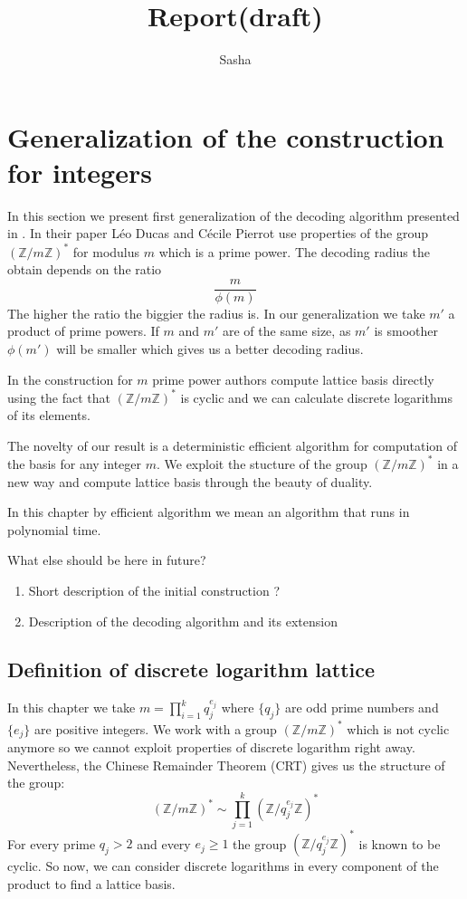 \documentclass[12pt]{article}
\title{Report(draft)}
\author{ Sasha }
\newcommand{\ZZ}{\mathbb{Z}}
\begin{document}
\maketitle

\section{Generalization of the construction for integers}
In this section we present first generalization of the decoding algorithm presented in \cite{[DP19]}. In their paper Léo Ducas and Cécile Pierrot use properties of the group $(\ZZ/m\ZZ)^*$ for modulus $m$ which is a prime power. The decoding radius the obtain  depends on the ratio
\[
\frac{m}{\phi(m)}
\]
The higher the ratio the biggier the radius is. In our generalization we take $m'$ a product of prime powers. If $m$ and $m'$ are of the same size, as $m'$ is smoother $\phi(m')$ will be smaller which gives us a better decoding radius.

In the construction for $m$ prime power authors compute lattice basis directly using the fact that $(\ZZ/m\ZZ)^*$ is cyclic and we can calculate discrete logarithms of its elements.

The novelty of our result is a deterministic efficient algorithm for computation of the basis for any integer $m$. We exploit the stucture of the group $(\ZZ/m\ZZ)^*$ in a new way and compute lattice basis through the beauty of duality.

In this chapter by efficient algorithm we mean an algorithm that runs in polynomial time.

What else should be here in future?
\begin{enumerate}
    \item Short description of the initial construction ?
    \item Description of the decoding algorithm and its extension
\end{enumerate}


\subsection{Definition of discrete logarithm lattice }
\label{definition section}
In this chapter we take $m = \prod_{i=1}^{k} q_{j}^{e_{j}}$ where $\{q_{j}\}$ are odd prime numbers and $\{e_{j}\}$ are positive integers. We work with a group $(\ZZ/m\ZZ)^*$ which is not cyclic anymore so we cannot exploit properties of discrete logarithm right away. Nevertheless, the Chinese Remainder Theorem (CRT) gives us the structure of the group:
\[
    (\ZZ/m\ZZ)^* \sim \prod_{j=1}^{k}(\ZZ/q_{j}^{e_{j}}\ZZ)^*
\]
For every prime $q_{j} > 2$ and every $e_{j} \geq 1$ the group $(\ZZ/q_{j}^{e_{j}}\ZZ)^*$ is known to be cyclic. So now, we can consider discrete logarithms in every component of the product to find a lattice basis.
\end{document}
